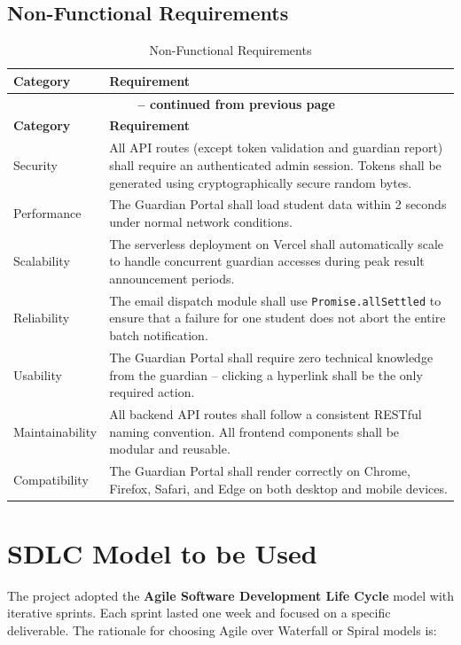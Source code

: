 \documentclass[12pt,a4paper]{report}
\begin{document}
\subsection{Non-Functional Requirements}

\begin{longtable}{|p{2.5cm}|p{10cm}|}
\caption{Non-Functional Requirements} \\
\hline
\textbf{Category} & \textbf{Requirement}\\
\hline
\endfirsthead
\multicolumn{2}{c}{{\bfseries \tablename\ \thetable{} -- continued from previous page}} \\
\hline
\textbf{Category} & \textbf{Requirement}\\
\hline
\endhead
Security & All API routes (except token validation and guardian report) shall require an authenticated admin session. Tokens shall be generated using cryptographically secure random bytes.\\
\hline
Performance & The Guardian Portal shall load student data within 2 seconds under normal network conditions.\\
\hline
Scalability & The serverless deployment on Vercel shall automatically scale to handle concurrent guardian accesses during peak result announcement periods.\\
\hline
Reliability & The email dispatch module shall use \texttt{Promise.allSettled} to ensure that a failure for one student does not abort the entire batch notification.\\
\hline
Usability & The Guardian Portal shall require zero technical knowledge from the guardian -- clicking a hyperlink shall be the only required action.\\
\hline
Maintainability & All backend API routes shall follow a consistent RESTful naming convention. All frontend components shall be modular and reusable.\\
\hline
Compatibility & The Guardian Portal shall render correctly on Chrome, Firefox, Safari, and Edge on both desktop and mobile devices.\\
\hline
\end{longtable}
\newpage
\section{SDLC Model to be Used}
The project adopted the \textbf{Agile Software Development Life Cycle} model with iterative sprints. Each sprint lasted one week and focused on a specific deliverable. The rationale for choosing Agile over Waterfall or Spiral models is:
\end{document}
